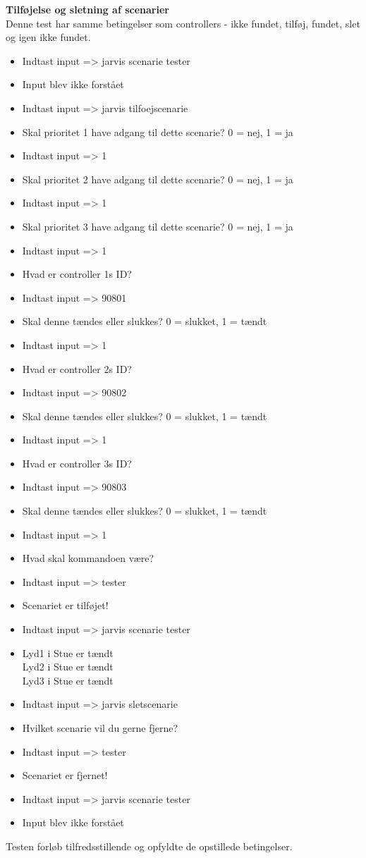 {\bf Tilføjelse og sletning af scenarier}\\
Denne test har samme betingelser som controllers - ikke fundet, tilføj, fundet, slet og igen ikke fundet.
\begin{itemize}[itemsep=0ex,topsep=1ex]
   \item Indtast input => jarvis scenarie tester
   \item Input blev ikke forstået
   \item Indtast input => jarvis tilfoejscenarie
   \item Skal prioritet 1 have adgang til dette scenarie? 0 = nej, 1 = ja
   \item Indtast input => 1
   \item Skal prioritet 2 have adgang til dette scenarie? 0 = nej, 1 = ja
   \item Indtast input => 1
   \item Skal prioritet 3 have adgang til dette scenarie? 0 = nej, 1 = ja
   \item Indtast input => 1
   \item Hvad er controller 1s ID?
   \item Indtast input => 90801
   \item Skal denne tændes eller slukkes? 0 = slukket, 1 = tændt
   \item Indtast input => 1
   \item Hvad er controller 2s ID?
   \item Indtast input => 90802
   \item Skal denne tændes eller slukkes? 0 = slukket, 1 = tændt
   \item Indtast input => 1
   \item Hvad er controller 3s ID?
   \item Indtast input => 90803
   \item Skal denne tændes eller slukkes? 0 = slukket, 1 = tændt
   \item Indtast input => 1
   \item Hvad skal kommandoen være?
   \item Indtast input => tester
   \item Scenariet er tilføjet!
   \item Indtast input => jarvis scenarie tester
   \item Lyd1 i Stue er tændt\\
         Lyd2 i Stue er tændt\\
         Lyd3 i Stue er tændt
   \item Indtast input => jarvis sletscenarie
   \item Hvilket scenarie vil du gerne fjerne?
   \item Indtast input => tester
   \item Scenariet er fjernet!
   \item Indtast input => jarvis scenarie tester
   \item Input blev ikke forstået
\end{itemize}
Testen forløb tilfredsstillende og opfyldte de opstillede betingelser.\\

